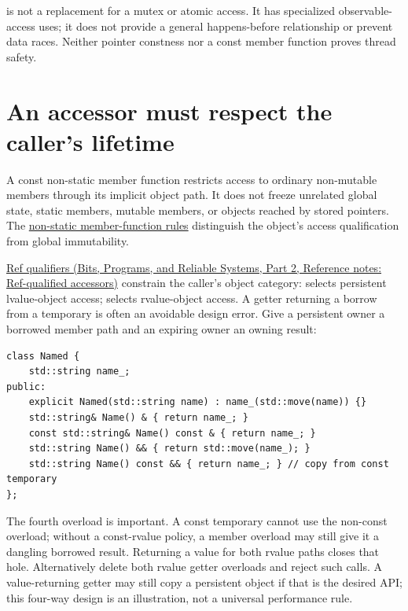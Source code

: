  is not a replacement for a mutex or atomic access. It has specialized observable-access uses; it does not provide a general happens-before relationship or prevent data races. Neither pointer constness nor a const member function proves thread safety.

\section{An accessor must respect the caller's lifetime}\label{05-engine-i-ch003-an-accessor-must-respect-the-callers-lifetime}

\hypertarget{05-engine-i-ch003-an-accessor-must-respect-the-callers-lifetime}{}

A const non-static member function restricts access to ordinary non-mutable members through its implicit object path. It does not freeze unrelated global state, static members, mutable members, or objects reached by stored pointers. The \href{https://eel.is/c++draft/class.mfct.non.static}{non-static member-function rules} distinguish the object's access qualification from global immutability.

\href{../01-Bits-Programs-and-Reliable-Systems-P02/main.pdf\#appendix-d42039b1d6f7}{Ref qualifiers (Bits, Programs, and Reliable Systems, Part 2, Reference notes: Ref-qualified accessors)} constrain the caller's object category: \BookInlineCode{{\&}}{\&} selects persistent lvalue-object access; \BookInlineCode{{\&}{\&}}{\&\&} selects rvalue-object access. A getter returning a borrow from a temporary is often an avoidable design error. Give a persistent owner a borrowed member path and an expiring owner an owning result:

\begin{verbatim}
class Named {
    std::string name_;
public:
    explicit Named(std::string name) : name_(std::move(name)) {}
    std::string& Name() & { return name_; }
    const std::string& Name() const & { return name_; }
    std::string Name() && { return std::move(name_); }
    std::string Name() const && { return name_; } // copy from const temporary
};
\end{verbatim}

The fourth overload is important. A const temporary cannot use the non-const \BookInlineCode{{\&}{\&}}{\&\&} overload; without a const-rvalue policy, a  member overload may still give it a dangling borrowed result. Returning a value for both rvalue paths closes that hole. Alternatively delete both rvalue getter overloads and reject such calls. A value-returning getter may still copy a persistent object if that is the desired API; this four-way design is an illustration, not a universal performance rule.

